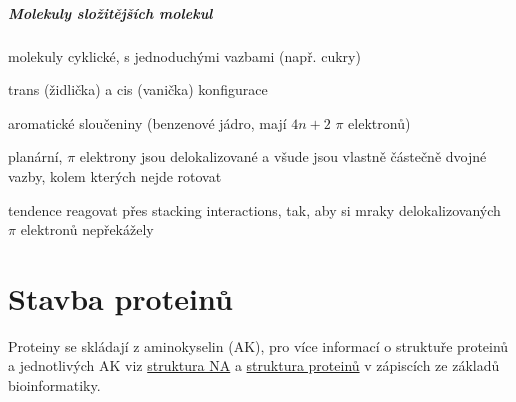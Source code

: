 \documentclass[DIV=8]{scrreprt}
\begin{document}
\paragraph{Molekuly složitějších molekul}
\begin{myItemize}[nosep]
    \item molekuly cyklické, s jednoduchými vazbami (např. cukry)
\begin{myItemize}[nosep]
    \item trans (židlička) a cis (vanička) konfigurace
\end{myItemize}

    \item aromatické sloučeniny (benzenové jádro, mají \(4n + 2\) \(\pi\) elektronů)
\begin{myItemize}[nosep]
    \item planární, \(\pi\) elektrony jsou delokalizované a všude jsou vlastně částečně dvojné vazby, kolem kterých nejde rotovat
    \item tendence reagovat přes stacking interactions, tak, aby si mraky delokalizovaných \(\pi\) elektronů nepřekážely
\end{myItemize}

\end{myItemize}



\chapter{Stavba proteinů} \label{Stavba proteinů}


Proteiny se skládají z aminokyselin (AK), pro více informací o struktuře proteinů a jednotlivých AK viz \href{/bioinformatika/doc/zaklady-bioinformatiky/notes.html\#Struktura nukleových kyselin}{struktura NA} a \href{/bioinformatika/doc/zaklady-bioinformatiky/notes.html\#Struktura proteinů}{struktura proteinů} v zápiscích ze základů bioinformatiky.
\end{document}
